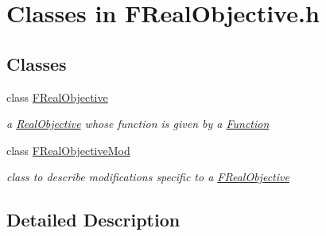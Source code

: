 \hypertarget{group___f_real_objective___c_l_a_s_s_e_s}{}\section{Classes in F\+Real\+Objective.\+h}
\label{group___f_real_objective___c_l_a_s_s_e_s}
\subsection*{Classes}
\begin{DoxyCompactItemize}
\item 
class \mbox{\hyperlink{class_s_m_spp__di__unipi__it_1_1_f_real_objective}{F\+Real\+Objective}}
\begin{DoxyCompactList}\small\item\em a \mbox{\hyperlink{class_s_m_spp__di__unipi__it_1_1_real_objective}{Real\+Objective}} whose function is given by a \mbox{\hyperlink{class_s_m_spp__di__unipi__it_1_1_function}{Function}} \end{DoxyCompactList}\item 
class \mbox{\hyperlink{class_s_m_spp__di__unipi__it_1_1_f_real_objective_mod}{F\+Real\+Objective\+Mod}}
\begin{DoxyCompactList}\small\item\em class to describe modifications specific to a \mbox{\hyperlink{class_s_m_spp__di__unipi__it_1_1_f_real_objective}{F\+Real\+Objective}} \end{DoxyCompactList}\end{DoxyCompactItemize}


\subsection{Detailed Description}
